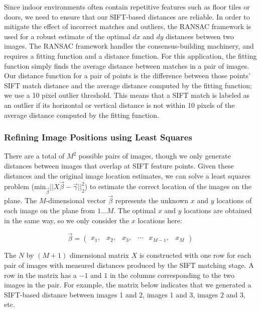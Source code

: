 \message{ !name(paper.tex)}\documentclass[10pt,twocolumn,letterpaper]{article}
\begin{document}
Since indoor environments often contain repetitive features such as
floor tiles or doors, we need to ensure that our SIFT-based distances
are reliable. In order to mitigate the effect of incorrect matches and
outliers, the RANSAC framework \cite{fischler1981random} is used for a
robust estimate of the optimal $dx$ and $dy$ distances between two
images. The RANSAC framework handles the consensus-building machinery,
and requires a fitting function and a distance function. For this
application, the fitting function simply finds the average distance
between matches in a pair of images. Our distance function for a pair
of points is the difference between those points' SIFT match distance
and the average distance computed by the fitting function; we use a 10
pixel outlier threshold. This means that a SIFT match is labeled as an
outlier if its horizontal or vertical distance is not within 10 pixels
of the average distance computed by the fitting function.

\subsubsection{Refining Image Positions using Least Squares}
\label{sec:refiningImagePositions}
There are a total of $M^{2}$ possible pairs of images, though we only
generate distances between images that overlap at SIFT feature
points. Given these distances and the original image location
estimates, we can solve a least squares problem ($\textrm{min}_{\vec{\beta}}
||X \vec{\beta} - \vec{\gamma}||_2^2 $) to estimate the correct location of the images
on the plane. The $M$-dimensional vector $\vec{\beta}$ represents the unknown $x$
and $y$ locations of each image on the plane from $1 \dots M$. The
optimal $x$ and $y$ locations are obtained in the same way, so we
only consider the $x$ locations here:


\[\vec{\beta} =
\begin{pmatrix}
  x_1, & x_2, & x_3, & \cdots & x_{M-1}, & x_M
\end{pmatrix}
\]

The $N$ by $(M+1)$ dimensional matrix $X$ is constructed with one row for each pair of images
with measured distances produced by the SIFT matching stage. A row in
the matrix has a $-1$ and $1$ in the columns corresponding to the two
images in the pair. For example, the matrix below indicates that we
generated a SIFT-based distance between images 1 and 2, images 1 and
3, images 2 and 3, etc.
\end{document}

